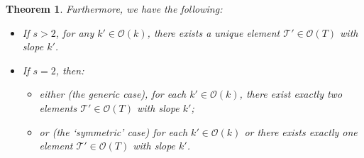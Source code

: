 \documentclass[10pt,a4paper]{amsart}
\newtheorem{theorem}{Theorem}
\begin{document}
\begin{theorem}
Furthermore, we have the following: 
\begin{itemize}
\item If $s>2$, for any $k'\in \mathcal O(k)$, there exists a unique element $\mathcal T'\in \mathcal O(T)$ with slope $k'$.
\item If $s=2$, then:
\begin{itemize}
\item either (the generic case), for each $k'\in \mathcal O(k)$,  there exist exactly two elements $\mathcal T'\in \mathcal O(T)$ with slope $k'$;
\item or (the `symmetric' case) for each $k'\in \mathcal O(k)$
or there exists exactly one element $\mathcal T'\in \mathcal O(T)$ with slope $k'$.
\end{itemize}
\end{itemize}
\end{theorem}
\end{document}
